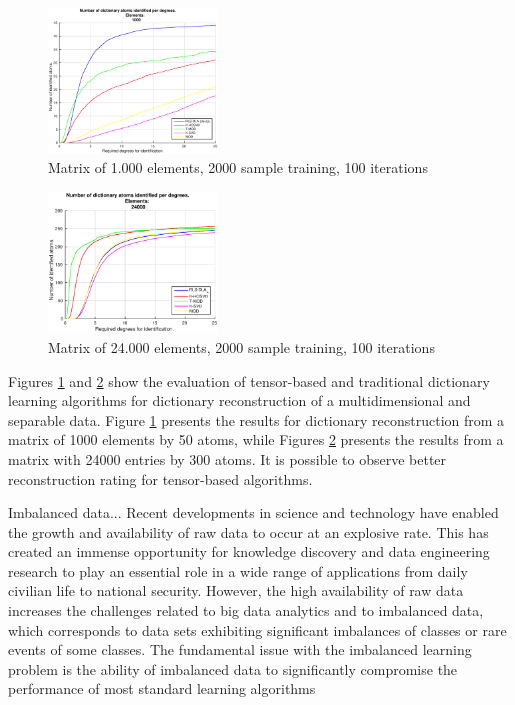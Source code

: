 \documentclass{article}
\begin{document}
\begin{figure}[!htb]
     \centering 
	 \includegraphics[width=0.4\textwidth]{figures/5_20_2000_1000_100.eps}
     \caption{Matrix of 1.000 elements, 2000 sample training, 100 iterations}
     \label{fig:fig1}
\end{figure}

\begin{figure}[!htb]
     \centering 
	 \includegraphics[width=0.4\textwidth]{figures/5_20_2000_24000_100.eps}
     \caption{Matrix of 24.000 elements, 2000 sample training, 100 iterations}
     \label{fig:fig2}
\end{figure}

Figures \ref{fig:fig1} and \ref{fig:fig2} show the evaluation of tensor-based and traditional dictionary learning algorithms for dictionary reconstruction of a multidimensional and separable data. Figure \ref{fig:fig1} presents the results for dictionary reconstruction from a matrix of 1000 elements by 50 atoms, while Figures \ref{fig:fig2} presents the results from a matrix with 24000 entries by 300 atoms. It is possible to observe better reconstruction rating for tensor-based algorithms. 

Imbalanced data...
Recent developments in science and technology have enabled the growth and availability of raw data to occur at an explosive rate. This has created an immense opportunity for knowledge discovery and data engineering research to play an essential role in a wide range of applications from daily civilian life to national security. However, the high availability of raw data increases the challenges related to big data analytics and to imbalanced data, which corresponds to data sets exhibiting significant imbalances of classes or rare events of some classes. The fundamental issue with the imbalanced learning problem is the ability of imbalanced data to significantly compromise the performance of most standard learning algorithms
\end{document}
